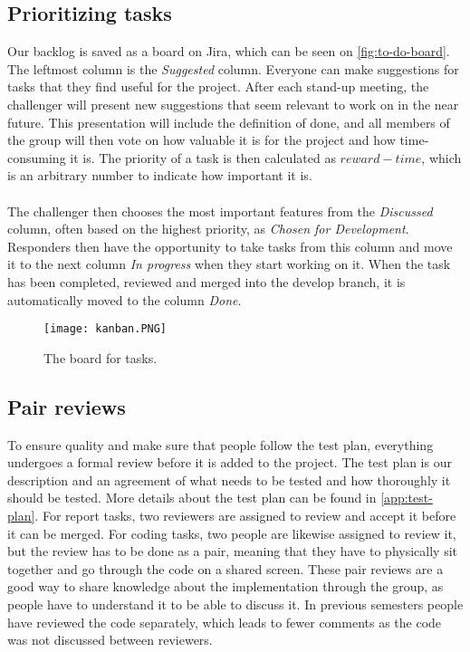 \subsection{Prioritizing tasks}
Our backlog is saved as a board on Jira, which can be seen on \autoref{fig:to-do-board}.
The leftmost column is the \textit{Suggested} column.
Everyone can make suggestions for tasks that they find useful for the project.
After each stand-up meeting, the challenger will present new suggestions that seem relevant to work on in the near future.
This presentation will include the definition of done, and all members of the group will then vote on how valuable it is for the project and how time-consuming it is.
The priority of a task is then calculated as $reward - time$, which is an arbitrary number to indicate how important it is.
\\\\
The challenger then chooses the most important features from the \textit{Discussed} column, often based on the highest priority, as \textit{Chosen for Development}.
Responders then have the opportunity to take tasks from this column and move it to the next column \textit{In progress} when they start working on it.
When the task has been completed, reviewed and merged into the develop branch, it is automatically moved to the column \textit{Done}.
\begin{figure}[H]
    \centering
    \texttt{[image: kanban.PNG]}
    \caption{The board for tasks.}
    \label{fig:to-do-board}
\end{figure}

\subsection{Pair reviews}
To ensure quality and make sure that people follow the test plan, everything undergoes a formal review before it is added to the project. 
The test plan is our description and an agreement of what needs to be tested and how thoroughly it should be tested.
More details about the test plan can be found in \autoref{app:test-plan}.
For report tasks, two reviewers are assigned to review and accept it before it can be merged.
For coding tasks, two people are likewise assigned to review it, but the review has to be done as a pair, meaning that they have to physically sit together and go through the code on a shared screen.
These pair reviews are a good way to share knowledge about the implementation through the group, as people have to understand it to be able to discuss it.
In previous semesters people have reviewed the code separately, which leads to fewer comments as the code was not discussed between reviewers.
